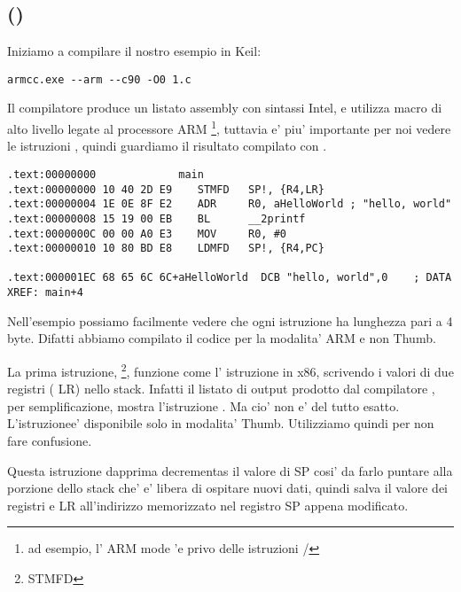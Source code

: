 \subsection{\NonOptimizingKeilVI (\ARMMode)}

Iniziamo a compilare il nostro esempio in Keil:

\begin{lstlisting}
armcc.exe --arm --c90 -O0 1.c 
\end{lstlisting}

\index{\IntelSyntax}
Il compilatore  produce un listato assembly con sintassi Intel,
e utilizza macro di alto livello legate al processore ARM
\footnote{ad esempio, l' ARM mode 'e privo delle istruzioni \PUSH/\POP},
tuttavia e' piu' importante per noi vedere le istruzioni , quindi guardiamo il risultato compilato con \IDA.

\begin{lstlisting}[caption=\NonOptimizingKeilVI (\ARMMode) \IDA]
.text:00000000             main
.text:00000000 10 40 2D E9    STMFD   SP!, {R4,LR}
.text:00000004 1E 0E 8F E2    ADR     R0, aHelloWorld ; "hello, world"
.text:00000008 15 19 00 EB    BL      __2printf
.text:0000000C 00 00 A0 E3    MOV     R0, #0
.text:00000010 10 80 BD E8    LDMFD   SP!, {R4,PC}

.text:000001EC 68 65 6C 6C+aHelloWorld  DCB "hello, world",0    ; DATA XREF: main+4
\end{lstlisting}

Nell'esempio possiamo facilmente vedere che ogni istruzione ha lunghezza pari a 4 byte.
Difatti abbiamo compilato il codice per la modalita' ARM e non Thumb.

La prima istruzione, \footnote{\ac{STMFD}},
funzione come l' istruzione \PUSH in x86, scrivendo i valori di due registri ( \ITAph{} \ac{LR}) nello stack.
Infatti il listato di output prodotto dal compilatore , per semplificazione, mostra l'istruzione .
Ma cio' non e' del tutto esatto. L'istruzione\PUSH e' disponibile solo in modalita' Thumb. Utilizziamo quindi \IDA per non fare confusione.

Questa istruzione dapprima \glspl{decrementa} il valore di \ac{SP} cosi' da farlo puntare alla porzione dello stack che' e' libera di ospitare nuovi dati, quindi salva il valore dei registri  e \ac{LR} all'indirizzo memorizzato nel registro \ac{SP} appena modificato.

